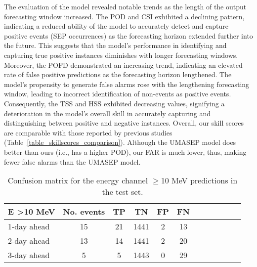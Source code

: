The evaluation of the model revealed notable trends as the length of the output forecasting window increased. The POD and CSI exhibited a declining pattern, indicating a reduced ability of the model to accurately detect and capture positive events (SEP occurrences) as the forecasting horizon extended further into the future. This suggests that the model's performance in identifying and capturing true positive instances diminishes with longer forecasting windows. Moreover, the POFD demonstrated an increasing trend, indicating an elevated rate of false positive predictions as the forecasting horizon lengthened. The model's propensity to generate false alarms rose with the lengthening forecasting window, leading to incorrect identification of non-events as positive events. Consequently, the TSS and HSS exhibited decreasing values, signifying a deterioration in the model's overall skill in accurately capturing and distinguishing between positive and negative instances. Overall, our skill scores are comparable with those reported by previous studies (Table~\ref{table_skillscores_comparison}). Although the UMASEP model does better than ours (i.e., has a higher POD), our FAR is much lower, thus, making fewer false alarms than the UMASEP model.

\begin{table}[htp]
\centering
\caption{Confusion matrix for the energy channel $\geq$10 MeV predictions in the test set.}
\label{table_skillscores}
\begin{tabular}{lccccccccccc}
\hline
E \textgreater{}10 MeV & No. events & TP & TN   & FP & FN \\ \hline
1-day ahead            & 15         & 21 & 1441 & 2  & 13 \\ \hline
2-day ahead            & 13         & 14 & 1441 & 2  & 20 \\ \hline
3-day ahead            & 5          & 5  & 1443 & 0  & 29 \\ \hline
\end{tabular}
\end{table}


